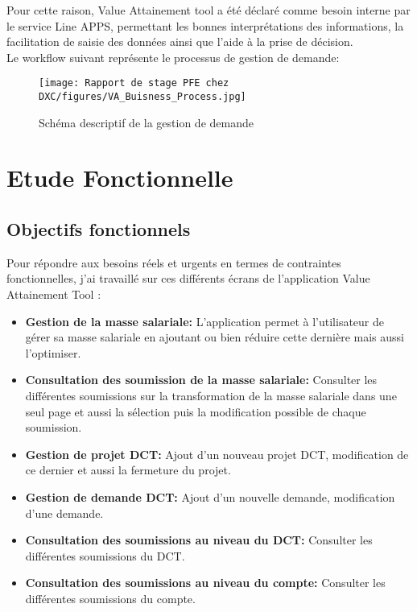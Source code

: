Pour cette raison, Value Attainement tool a été déclaré comme besoin interne par le service Line APPS, permettant les bonnes interprétations des informations, la facilitation de saisie des données ainsi que l’aide à la prise de décision.
\\

Le workflow suivant représente le processus de gestion de demande:


\begin{figure}[!h]
    \centering
    \texttt{[image: Rapport de stage PFE chez DXC/figures/VA\_Buisness\_Process.jpg]}
    \caption{Schéma descriptif de la gestion de demande}
\end{figure}

\newpage
\section{Etude Fonctionnelle}

\subsection{Objectifs fonctionnels}

Pour répondre aux besoins réels et urgents en termes de contraintes fonctionnelles, j'ai travaillé sur ces différents écrans de l'application Value Attainement Tool :
\\
\begin{itemize}
    \item \textbf{Gestion de la masse salariale:} L'application permet à l'utilisateur de gérer sa masse salariale en ajoutant ou bien réduire cette dernière mais aussi l'optimiser.
    
    \item \textbf{Consultation des soumission de la masse salariale:} Consulter les différentes soumissions sur la transformation de la masse salariale dans une seul page et aussi la sélection puis la modification possible de chaque soumission.
    
    \item \textbf{Gestion de projet DCT:} Ajout d'un nouveau projet DCT, modification de ce dernier et aussi la fermeture du projet.
    
    \item \textbf{Gestion de demande DCT:} Ajout d'un nouvelle demande, modification d'une demande.
    
    \item \textbf{Consultation des soumissions au niveau du DCT:} Consulter les différentes soumissions du DCT.
    
    \item \textbf{Consultation des soumissions au niveau du compte:} Consulter les différentes soumissions du compte.
    
\end{itemize}

